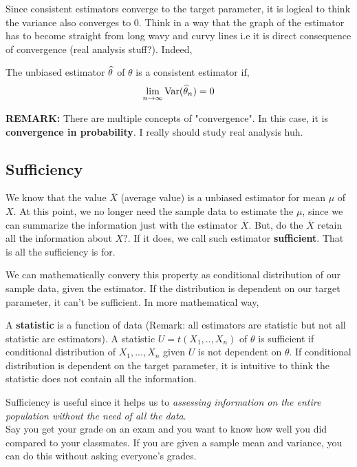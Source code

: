Since consistent estimators converge to the target parameter, it is logical to think the variance also converges to $0$. Think in a way that the graph of the estimator has to become straight from long wavy and curvy lines i.e it is direct consequence of convergence (real analysis stuff?). Indeed,
\begin{theorem}
    The unbiased estimator ${\widehat{\theta}}$ of $\theta$ is a consistent estimator if, 
    \[ \lim_{n \rightarrow \infty} {\operatorname{Var}}({\widehat{\theta}}_{n}) = 0 \]
\end{theorem}
\textbf{REMARK:} There are multiple concepts of "convergence". In this case, it is \textbf{convergence in probability}. I really should study real analysis huh.

\begin{center} \resizebox{0.7\textwidth}{!}{}  \end{center}



\subsection*{Sufficiency}
We know that the value $\overline{X}$ (average value) is a unbiased estimator for mean $\mu$ of $X$. At this point, we no longer need the sample data to estimate the $\mu$, since we can summarize the information just with the estimator $\overline{X}$.
But, do the $\overline{X}$ retain all the information about $X$?. If it does, we call such estimator \textbf{sufficient}. That is all the sufficiency is for.

We can mathematically convery this property as conditional distribution of our sample data, given the estimator. If the distribution is dependent on our target parameter, it can't be sufficient. In more mathematical way,
\begin{definition}
    A \textbf{statistic} is a function of data (Remark: all estimators are statistic but not all statistic are estimators). A statistic $U = t(X_1,..,X_n)$ of $\theta$ is sufficient if conditional distribution of $X_1,...,X_n$ given $U$ is not dependent on $\theta$.
    \newline
    \newline
    If conditional distribution is dependent on the target parameter, it is intuitive to think the statistic does not contain all the information.
\end{definition}
Sufficiency is useful since it helps us to \textit{assessing information on the entire population without the need of all the data}.\\
Say you get your grade on an exam and you want to know how well you did compared to your classmates. If you are given a sample mean and variance, you can do this without asking everyone's grades.
